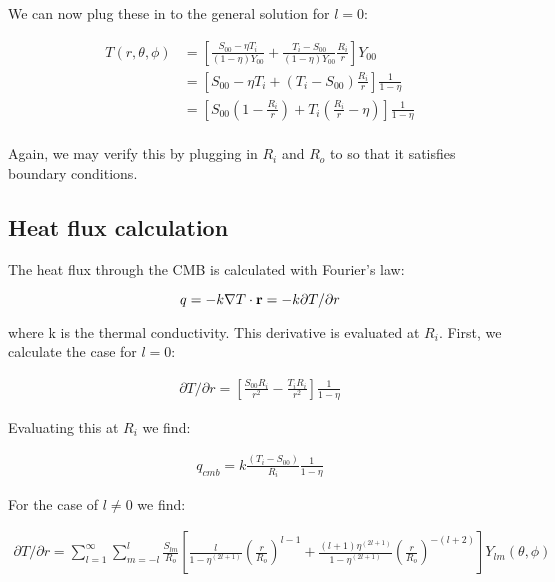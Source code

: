 \documentclass[a4paper,10pt]{article}
\begin{document}
We can now plug these in to the general solution for $l=0$:

\begin{equation}
\begin{aligned}
T(r, \theta, \phi) &= \left[ \frac{S_{00} - \eta T_i}{(1-\eta)Y_{00}} + \frac{T_i - S_{00}}{(1-\eta)Y_{00}} \frac{R_i}{r} \right] Y_{00} \\
&= \left[ S_{00} - \eta T_i + (T_i - S_{00}) \frac{R_i}{r} \right] \frac{1}{1-\eta} \\
&= \left[ S_{00} (1-\frac{R_i}{r}) + T_i ( \frac{R_i}{r} - \eta ) \right] \frac{1}{1-\eta} \\
\end{aligned}
\end{equation}

Again, we may verify this by plugging in $R_i$ and $R_o$ to so that it satisfies boundary conditions.

\subsection{Heat flux calculation}

The heat flux through the CMB is calculated with Fourier's law:

\begin{equation}
q = -k \nabla T \cdot {\bf{r}} = -k \partial T / \partial r
\end{equation}

where k is the thermal conductivity.  This derivative is evaluated at $R_i$.  First, we calculate the case for $l=0$:

\begin{equation}
\begin{aligned}
\partial T/ \partial r = \left[ \frac{ S_{00} R_i }{r^2} - \frac{T_i R_i}{r^2} \right] \frac{1}{1-\eta}
\end{aligned}
\end{equation}

Evaluating this at $R_i$ we find:

\begin{equation}
\begin{aligned}
q_{cmb} = k \frac{(T_i - S_{00})}{R_i} \frac{1}{1-\eta}
\end{aligned}
\end{equation}

For the case of $l \ne 0$ we find:

\begin{equation}
\begin{aligned}
\partial T / \partial r = \displaystyle \sum_{l=1}^{\infty} \sum_{m=-l}^{l} \frac{S_{lm}}{R_o} \left[ \frac{l}{1-\eta^{(2l+1)}} \left(\frac{r}{R_o}\right)^{l-1} +  \frac{(l+1) \eta^{(2l+1)}}{1-\eta^{(2l+1)}} \left(\frac{r}{R_o}\right)^{-(l+2)} \right] Y_{lm}(\theta,\phi)
\end{aligned}
\end{equation}
\end{document}
